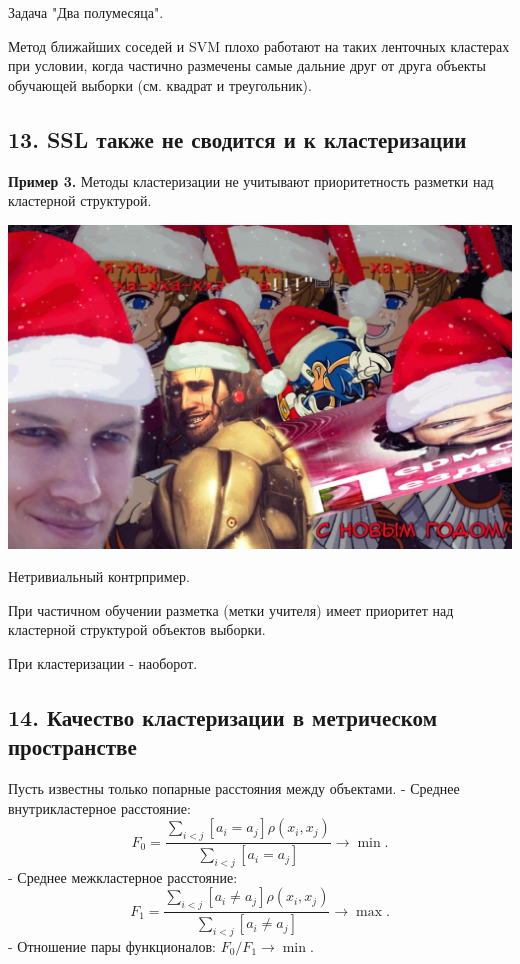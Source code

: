 Задача "Два полумесяца".

Метод ближайших соседей и SVM плохо работают на таких ленточных кластерах
при условии, когда частично размечены самые дальние друг от друга объекты
обучающей выборки (см. квадрат и треугольник).

\subsection{13. SSL также не сводится и к кластеризации}

\textbf{Пример 3.}
Методы кластеризации не учитывают приоритетность разметки над кластерной
структурой.

\includegraphics[scale=0.3]{figures/samplefigure.jpg}

Нетривиальный контрпример.

При частичном обучении разметка (метки учителя) имеет приоритет над
кластерной структурой объектов выборки.

При кластеризации - наоборот.

\subsection{14. Качество кластеризации в метрическом пространстве}

Пусть известны только попарные расстояния между объектами.
- Среднее внутрикластерное расстояние:
$$\displaystyle F_0 = \frac{\displaystyle \sum_{i<j}{{\left[ a_i = a_j \right]} \rho{( x_i, x_j)}}}{\displaystyle \sum_{i<j}{{\left[ a_i = a_j \right]}}} \rightarrow \min.$$
- Среднее межкластерное расстояние:
$$\displaystyle F_1 = \frac{\displaystyle \sum_{i<j}{{\left[ a_i \neq a_j \right]} \rho{( x_i, x_j)}}}{\displaystyle \sum_{i<j}{{\left[ a_i \neq a_j \right]}}} \rightarrow \max.$$
- Отношение пары функционалов: $F_0 / F_1 \rightarrow \min$.


